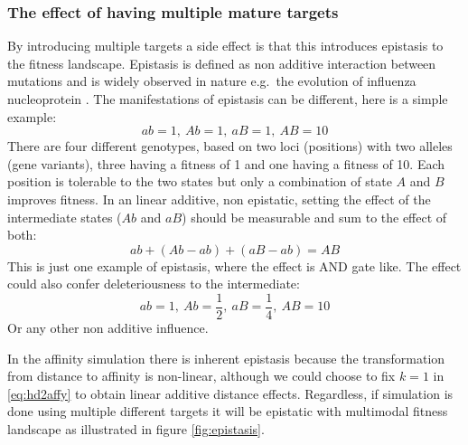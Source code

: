 \subsubsection{The effect of having multiple mature targets}
By introducing multiple targets a side effect is that this introduces epistasis to the fitness landscape.
Epistasis is defined as non additive interaction between mutations and is widely observed in nature e.g.\ the evolution of influenza nucleoprotein \cite{gong2013stability}.
The manifestations of epistasis can be different, here is a simple example:
$$
ab = 1,\ Ab = 1,\ aB = 1,\ AB = 10
$$
There are four different genotypes, based on two loci (positions) with two alleles (gene variants), three having a fitness of 1 and one having a fitness of 10.
Each position is tolerable to the two states but only a combination of state $A$ and $B$ improves fitness.
In an linear additive, non epistatic, setting the effect of the intermediate states ($Ab$ and $aB$) should be measurable and sum to the effect of both:
$$
ab + (Ab - ab) + (aB -ab) = AB
$$
This is just one example of epistasis, where the effect is AND gate like.
The effect could also confer deleteriousness to the intermediate:
$$
ab = 1,\ Ab = \frac{1}{2},\ aB = \frac{1}{4},\ AB = 10
$$
Or any other non additive influence.

In the affinity simulation there is inherent epistasis because the transformation from distance to affinity is non-linear, although we could choose to fix $k=1$ in \eqref{eq:hd2affy} to obtain linear additive distance effects.
Regardless, if simulation is done using multiple different targets it will be epistatic with multimodal fitness landscape as illustrated in figure \ref{fig:epistasis}.

